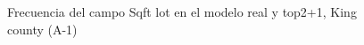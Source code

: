 \begin{figure}[H]
    \centering
    
    \caption{Frecuencia del campo Sqft lot en el modelo real y top2+1, King county (A-1)}
    \label{frecuency-top2+1-sqft lot}
\end{figure}
